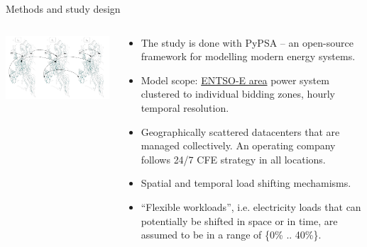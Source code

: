   
  \begin{frame}{Methods and study design}
  
    {\footnotesize
    \begin{columns}
    \begin{column}{9cm}
    \includegraphics[width=10cm]{images/spatial-temporal-vlinks-cropped.png}
    \end{column}
  
    \begin{column}{6cm}
      \begin{itemize}
        \vspace{-0.1cm}
        \item The study is done with \alert{PyPSA} -- an open-source framework for modelling modern energy systems.
        \item Model scope: \alert{\href{https://www.entsoe.eu/data/map/}{ENTSO-E area}} power system clustered to individual bidding zones, \alert{hourly} temporal resolution. 
        \item Geographically scattered datacenters that are managed collectively. An operating company follows \alert{24/7 CFE strategy} in all locations.
        \item \alert{Spatial} and \alert{temporal} load shifting mechamisms.
        \item \alert{\enquote{Flexible workloads}}, i.e. electricity loads that can potentially be shifted in space or in time, are assumed to be in a range of {\{0\% .. 40\%\}}.
      \end{itemize}
      \end{column}
      \end{columns}
    }
\end{frame}
  

